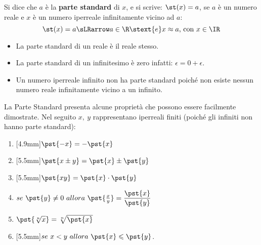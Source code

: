 % 

\begin{definizione}
 Si dice che \(a\) è la \textbf{parte standard} di \(x\), e si scrive: 
 \(\st(x) = a\), se \(a\) è un numero reale e \(x\) è un numero iperreale
infinitamente vicino ad \(a\):
\[\st(x) = a \sLRarrow a \in \R \stext{e} x \approx a\mbox{, con }x\in \IR\]
\end{definizione}
\begin{osservazione}
\begin{itemize} [nosep]
 \item 
La parte standard di un reale è il reale stesso.
 \item 
La parte standard di un infinitesimo è zero infatti:
\(\epsilon = 0+\epsilon\).
 \item 
Un numero iperreale infinito non ha parte standard poiché non esiste nessun 
numero reale infinitamente vicino a un infinito.
\end{itemize}
\end{osservazione}
\vspace{1em}
La Parte Standard presenta alcune proprietà che possono essere facilmente 
dimostrate. Nel seguito \(x,\ y\) rappresentano iperreali finiti 
(poiché gli infiniti non hanno parte standard):

\begin{multicols}{2}
\begin{enumerate} [nosep]
 \item \raisebox{+0mm}[4.9mm]{}\(\pst{-x} = -\pst{x}\)
 \item \raisebox{+0mm}[5.5mm]{}\(\pst{x \pm y} = \pst{x} \pm \pst{y}\)
 \item \raisebox{+0mm}[5.5mm]{}\(\pst{xy} = \pst{x} \cdot \pst{y}\)
 \item \(se ~ \pst{y} \neq 0 ~ allora ~
 \pst{\frac{x}{y}} = \dfrac{\pst{x}}{\pst{y}}\)
 \item \(\pst{\sqrt[n]{x}} = \sqrt[n]{\pst{x}}\)
 \item \raisebox{+0mm}[5.5mm]{}\(se ~  x < y ~ allora ~ 
 \pst{x} \leqslant \pst{y}\).
\end{enumerate}
\end{multicols}

